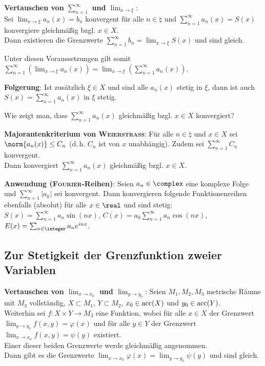 \textbf{Vertauschen von $\sum_{n=1}^\infty$ und $\lim_{x \to \xi}$}: \\
Sei $\lim_{x \to \xi} a_n(x) = b_n$ konvergent für alle $n \in \natural$ und
$\sum_{n=1}^\infty a_n(x) = S(x)$ konvergiere gleichmäßig bzgl. $x \in X$. \\
Dann existieren die Grenzwerte
$\sum_{n=1}^\infty b_n = \lim_{x \to \xi} S(x)$ und sind gleich.

Unter diesen Voraussetzungen gilt somit
$\sum_{n=1}^\infty \left(\lim_{x \to \xi} a_n(x)\right) =
\lim_{x \to \xi} \left(\sum_{n=1}^\infty a_n(x)\right)$.

\textbf{Folgerung}: Ist zusätzlich $\xi \in X$ und sind alle $a_n(x)$
stetig in $\xi$, dann ist auch \\
$S(x) = \sum_{n=1}^\infty a_n(x)$ in $\xi$ stetig.

\linie

Wie zeigt man, dass $\sum_{n=1}^\infty a_n(x)$ gleichmäßig bzgl. $x \in X$
konvergiert?

\textbf{Majorantenkriterium von \textsc{Weierstraß}}:
Für alle $n \in \natural$ und $x \in X$ sei $\norm{a_n(x)} \le C_n$
(d.\,h. $C_n$ ist von $x$ unabhängig).
Zudem sei $\sum_{n=1}^\infty C_n$ konvergent. \\
Dann konvergiert $\sum_{n=1}^\infty a_n(x)$ gleichmäßig bzgl. $x \in X$.

\textbf{Anwendung (\textsc{Fourier}-Reihen)}:
Seien $a_n \in \complex$ eine komplexe Folge und $\sum_{n=1}^\infty |a_k|$
sei konvergent.
Dann konvergieren folgende Funktionenreihen ebenfalls (absolut) für alle
$x \in \real$ und sind stetig:
$S(x) = \sum_{n=1}^\infty a_n \sin(nx)$,
$C(x) = a_0 \sum_{n=1}^\infty a_n \cos(nx)$,
$E(x) = \sum_{n \in \integer} a_n e^{inx}$.

\pagebreak

\subsection{%
    Zur Stetigkeit der Grenzfunktion zweier Variablen%
}

\textbf{Vertauschen von $\lim_{x \to x_0}$ und $\lim_{y \to y_0}$}:
Seien $M_1, M_2, M_3$ metrische Räume mit $M_3$ vollständig,
$X \subset M_1$, $Y \subset M_2$, $x_0 \in \operatorname{acc}(X)$ und $y_0 \in \operatorname{acc}(Y)$. \\
Weiterhin sei $f: X \times Y \rightarrow M_3$ eine Funktion, wobei
für alle $x \in X$ der Grenzwert \\
$\lim_{y \to y_0} f(x, y) = \varphi(x)$
und für alle $y \in Y$ der Grenzwert $\lim_{x \to x_0} f(x, y) = \psi(y)$
existiert. \\
Einer dieser beiden Grenzwerte werde gleichmäßig angenommen. \\
Dann gibt es die Grenzwerte
$\lim_{x \to x_0} \varphi(x) = \lim_{y \to y_0} \psi(y)$ und sind gleich.

